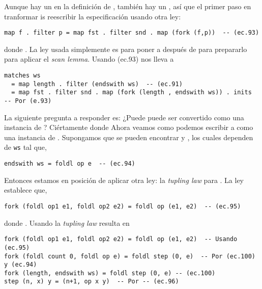 Aunque hay un  en la definición de , también hay un , así que el primer paso en tranformar  is reescribir la especificación usando otra ley: %

\begin{verbatim}
map f . filter p = map fst . filter snd . map (fork (f,p))  -- (ec.93)
\end{verbatim}

donde . La ley usada simplemente es para poner a 
después de  para prepararlo para aplicar el \textit{scan lemma}. Usando (ec.93) nos lleva a

\begin{verbatim}
matches ws
  = map length . filter (endswith ws)  -- (ec.91)
  = map fst . filter snd . map (fork (length , endswith ws)) . inits  -- Por (e.93)
\end{verbatim}

La siguiente pregunta a responder es: ¿Puede  puede ser convertido
como una instancia de ? Ciértamente  donde
Ahora veamos como podemos escribir a  como una instancia de .
Supongamos que se pueden encontrar  y , los cuales dependen de \texttt{ws} tal que,

\begin{verbatim}
endswith ws = foldl op e  -- (ec.94)
\end{verbatim}

Entonces estamos en posición de aplicar otra ley: la \textit{tupling law} para . La ley establece que,

\begin{verbatim}
fork (foldl op1 e1, foldl op2 e2) = foldl op (e1, e2)  -- (ec.95)
\end{verbatim}

donde . Usando la \textit{tupling law} resulta en

\begin{verbatim}
fork (foldl op1 e1, foldl op2 e2) = foldl op (e1, e2)  -- Usando (ec.95)
fork (foldl count 0, foldl op e) = foldl step (0, e)  -- Por (ec.100) y (ec.94)
fork (length, endswith ws) = foldl step (0, e) -- (ec.100)
step (n, x) y = (n+1, op x y)  -- Por -- (ec.96)
\end{verbatim}

